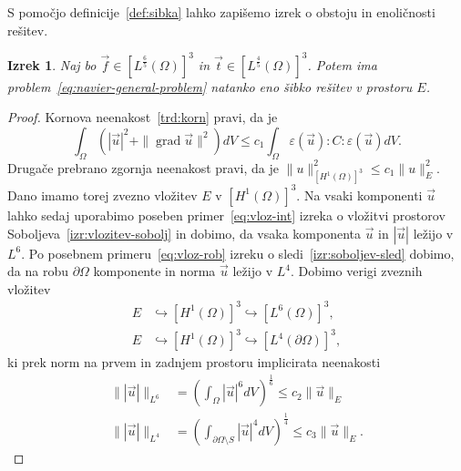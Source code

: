 \documentclass[12pt,a4paper,twoside]{article}
\theoremstyle{definition} %
\theoremstyle{plain} %
\newtheorem{izrek}[definicija]{Izrek}
\numberwithin{equation}{section}
\newcommand{\grad}{\operatorname{grad}}
\newcommand{\eps}{\varepsilon}
\newcommand{\vt}{\vec{t}}
\newcommand{\vu}{\vec{u}}
\newcommand{\vf}{\vec{f}}
\begin{document}
S pomočjo definicije~\ref{def:sibka} lahko zapišemo izrek o obstoju in enoličnosti rešitev.
\begin{izrek}
  \label{izr:enol-obst}
  Naj bo $\vf \in [L^\frac65(\Omega)]^3$ in $\vt \in [L^{\frac45}(\Omega)]^3$.
  Potem ima problem~\ref{eq:navier-general-problem} natanko eno šibko rešitev v
  prostoru $E$.
\end{izrek}
\begin{proof}
Kornova neenakost~\ref{trd:korn} pravi, da je
\begin{equation*}
   \int_{\Omega} (|\vu|^2 + \|\grad \vu\|^2) dV \leq c_1 \int_{\Omega} \eps(\vu):C:\eps(\vu)dV.
\end{equation*}
Drugače prebrano zgornja neenakost pravi, da je $\|u\|_{[H^1(\Omega)]^3}^2 \leq c_1 \|u\|_E^2$. Dano
imamo torej zvezno vložitev $E$ v $[H^1(\Omega)]^3$. Na vsaki komponenti $\vu$ lahko sedaj uporabimo
poseben primer~\eqref{eq:vloz-int} izreka o vložitvi prostorov Soboljeva~\ref{izr:vlozitev-sobolj}
in dobimo, da vsaka komponenta $\vu$ in $|\vu|$ ležijo v $L^6$. Po posebnem
primeru~\eqref{eq:vloz-rob} izreku o sledi~\ref{izr:soboljev-sled} dobimo, da na robu
$\partial\Omega$ komponente in norma $\vu$ ležijo v $L^4$. Dobimo verigi zveznih vložitev
\begin{align*}
  E &\hookrightarrow [H^1(\Omega)]^3 \hookrightarrow [L^6(\Omega)]^3, \\
  E &\hookrightarrow [H^1(\Omega)]^3 \hookrightarrow [L^4(\partial\Omega)]^3,
\end{align*}
ki prek norm na prvem in zadnjem prostoru implicirata neenakosti
\begin{align*}
  \||\vu|\|_{L^6} &= \left( \int_{\Omega} |\vu|^6 dV \right)^\frac16 \leq
  c_2 \|\vu\|_E \\
  \||\vu|\|_{L^4} &= \left( \int_{\partial\Omega\setminus S} |\vu|^4 dV \right)^\frac14 \leq
  c_3 \|\vu\|_E.
\end{align*}


\end{proof}
\end{document}
